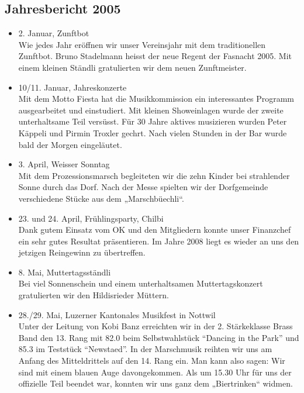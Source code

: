 \subsection{Jahresbericht 2005}

\begin{history}


    \begin{itemize}

        \item[]2. Januar, Zunftbot\\
        Wie jedes Jahr eröffnen wir unser Vereinsjahr mit dem traditionellen
        Zunftbot. Bruno Stadelmann heisst der neue Regent der Fasnacht 2005. Mit
        einem kleinen Ständli gratulierten wir dem neuen Zunftmeister.

        \item[]10/11. Januar, Jahreskonzerte\\
        Mit dem Motto Fiesta hat die Musikkommission ein interessantes Programm
        ausgearbeitet und einstudiert. Mit kleinen Showeinlagen wurde der zweite
        unterhaltsame Teil versüsst. Für 30 Jahre aktives musizieren wurden
        Peter Käppeli und Pirmin Troxler gechrt. Nach vielen Stunden in der Bar
        wurde bald der Morgen eingeläutet.

        \item[]3. April, Weisser Sonntag\\
        Mit dem Prozessionsmarsch begleiteten wir die zehn Kinder bei
        strahlender Sonne durch das Dorf. Nach der Messe spielten wir der
        Dorfgemeinde verschiedene Stücke aus dem „Marschbüechli“.

        \item[]23. und 24. April, Frühlingsparty, Chilbi\\
        Dank gutem Einsatz vom OK und den
        Mitgliedern konnte unser Finanzchef ein sehr gutes Resultat präsentieren.
        Im Jahre 2008 liegt es wieder an uns den jetzigen Reingewinn zu
        übertreffen.

        \item[]8. Mai, Muttertagsständli\\
        Bei viel Sonnenschein und einem unterhaltsamen Muttertagskonzert
        gratulierten wir den Hildisrieder Müttern.

        \item[]28./29. Mai, Luzerner Kantonales Musikfest in Nottwil\\
        Unter der Leitung von Kobi Banz erreichten wir in der 2. Stärkeklasse
        Brass Band den 13. Rang mit 82.0 beim Selbstwahlstück \enquote{Dancing in the
            Park} und 85.3 im Teststück \enquote{Newstaed}. In der Marschmusik reihten wir
        uns am Anfang des Mitteldrittels auf den 14. Rang ein. Man kann also
        sagen: Wir sind mit einem blauen Auge davongekommen. Als um 15.30 Uhr
        für uns der offizielle Teil beendet war, konnten wir uns ganz dem
        „Biertrinken“ widmen.


\end{itemize}
\end{history}
